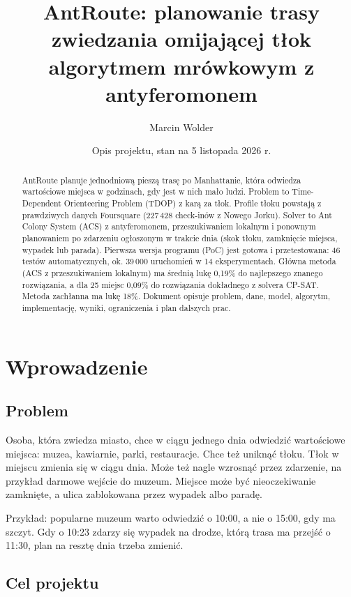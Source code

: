 \documentclass[11pt,a4paper]{article}
\title{AntRoute: planowanie trasy zwiedzania omijającej tłok\\
algorytmem mrówkowym z antyferomonem}
\author{Marcin Wolder}
\date{Opis projektu, stan na 5 listopada 2026 r.}
\begin{document}
\maketitle

\begin{abstract}
AntRoute planuje jednodniową pieszą trasę po Manhattanie, która odwiedza wartościowe miejsca w godzinach, gdy jest w nich mało ludzi. Problem to Time-Dependent Orienteering Problem (TDOP) z karą za tłok. Profile tłoku powstają z prawdziwych danych Foursquare (227\,428 check-inów z Nowego Jorku). Solver to Ant Colony System (ACS) z antyferomonem, przeszukiwaniem lokalnym i ponownym planowaniem po zdarzeniu ogłoszonym w trakcie dnia (skok tłoku, zamknięcie miejsca, wypadek lub parada). Pierwsza wersja programu (PoC) jest gotowa i przetestowana: 46 testów automatycznych, ok. 39\,000 uruchomień w 14 eksperymentach. Główna metoda (ACS z przeszukiwaniem lokalnym) ma średnią lukę 0,19\% do najlepszego znanego rozwiązania, a dla 25 miejsc 0,09\% do rozwiązania dokładnego z solvera CP-SAT. Metoda zachłanna ma lukę 18\%. Dokument opisuje problem, dane, model, algorytm, implementację, wyniki, ograniczenia i plan dalszych prac.
\end{abstract}

\tableofcontents

\section{Wprowadzenie}

\subsection{Problem}

Osoba, która zwiedza miasto, chce w ciągu jednego dnia odwiedzić wartościowe miejsca: muzea, kawiarnie, parki, restauracje. Chce też uniknąć tłoku. Tłok w miejscu zmienia się w ciągu dnia. Może też nagle wzrosnąć przez zdarzenie, na przykład darmowe wejście do muzeum. Miejsce może być nieoczekiwanie zamknięte, a ulica zablokowana przez wypadek albo paradę.

Przykład: popularne muzeum warto odwiedzić o 10:00, a nie o 15:00, gdy ma szczyt. Gdy o 10:23 zdarzy się wypadek na drodze, którą trasa ma przejść o 11:30, plan na resztę dnia trzeba zmienić.

\subsection{Cel projektu}
\end{document}
